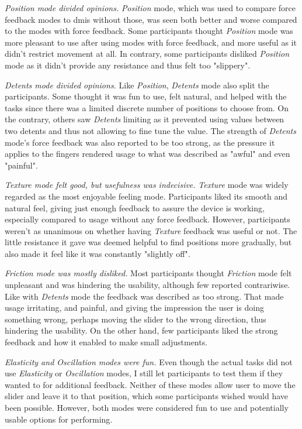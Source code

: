 \textit{Position mode divided opinions.} \textit{Position} mode, which was used to compare force feedback modes to \glspl{dmi} without those, was seen both better and worse compared to the modes with force feedback. Some participants thought \textit{Position} mode was more pleasant to use after using modes with force feedback, and more useful as it didn't restrict movement at all. In contrary, some participants disliked \textit{Position} mode as it didn't provide any resistance and thus felt too "slippery".

\textit{Detents mode divided opinions.} Like \textit{Position}, \textit{Detents} mode also split the participants. Some thought it was fun to use, felt natural, and helped with the tasks since there was a limited discrete number of positions to choose from. On the contrary, others saw \textit{Detents} limiting as it prevented using values between two detents and thus not allowing to fine tune the value. The strength of \textit{Detents} mode's force feedback was also reported to be too strong, as the pressure it applies to the fingers rendered usage to what was described as "awful" and even "painful".

\textit{Texture mode felt good, but usefulness was indecisive.} \textit{Texture} mode was widely regarded as the most enjoyable feeling mode. Participants liked its smooth and natural feel, giving just enough feedback to assure the device is working, especially compared to usage without any force feedback. However, participants weren't as unanimous on whether having \textit{Texture} feedback was useful or not. The little resistance it gave was deemed helpful to find positions more gradually, but also made it feel like it was constantly "slightly off".

\textit{Friction mode was mostly disliked.} Most participants thought \textit{Friction} mode felt unpleasant and was hindering the usability, although few reported contrariwise. Like with \textit{Detents} mode the feedback was described as too strong. That made usage irritating, and painful, and giving the impression the user is doing something wrong, perhaps moving the slider to the wrong direction, thus hindering the usability. On the other hand, few participants liked the strong feedback and how it enabled to make small adjustments.

\textit{Elasticity and Oscillation modes were fun.} Even though the actual tasks did not use \textit{Elasticity} or \textit{Oscillation} modes, I still let participants to test them if they wanted to for additional feedback. Neither of these modes allow user to move the slider and leave it to that position, which some participants wished would have been possible. However, both modes were considered fun to use and potentially usable options for performing.

